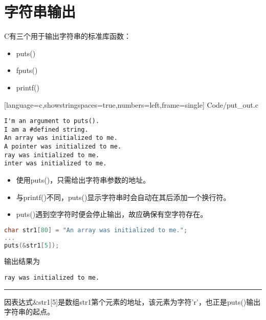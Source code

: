 \section{字符串输出}

\begin{frame}[fragile] 
C有三个用于输出字符串的标准库函数：
\begin{itemize}
\item {\tf puts()}
\item {\tf fputs()}
\item {\tf printf()}
\end{itemize}
\end{frame}



\begin{frame} 

[language=c,showstringspaces=true,numbers=left,frame=single]
{Code/put_out.c}
\end{frame}


\begin{frame}[fragile] 
\begin{lstlisting}[basicstyle=\ttfamily]
I'm an argument to puts().
I am a #defined string.
An array was initialized to me.
A pointer was initialized to me.
ray was initialized to me.
inter was initialized to me.
\end{lstlisting}
\end{frame}


\begin{frame}[fragile] 
\begin{itemize}
\item
使用{\tf puts()}，只需给出字符串参数的地址。 \\[0.1in]
\item 
与{\tf printf()}不同，{\tf puts()}显示字符串时会自动在其后添加一个换行符。\\[0.1in]
\item
{\tf puts()}遇到空字符时便会停止输出，故应确保有空字符存在。
\end{itemize}
\end{frame}

\begin{frame}[fragile] 
\begin{lstlisting}[language=c]
char str1[80] = "An array was initialized to me.";
...
puts(&str1[5]);
\end{lstlisting}
输出结果为
\begin{lstlisting}[basicstyle=\ttfamily]
ray was initialized to me.
\end{lstlisting}
\pause \rule{\textwidth}{0.3mm} \vspace{0.1mm}

因表达式{\tf \&str1[5]}是数组{\tf str1}第{}个元素的地址，该元素为字符{\tf 'r'}，也正是{\tf puts()}输出字符串的起点。
\end{frame}


